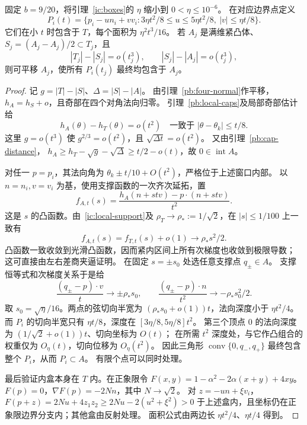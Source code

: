\begin{lemma}[小缺面积下侧弧内盒的传递]\label{ic:transfer}
固定 $b=9/20$，将引理~\ref{ic:boxes}的 $\eta$ 缩小到 $0<\eta\le10^{-6}$。
在对应边界点定义
\[
 P_i(t)=\{p_i-u n_i+v v_i:
 3\eta t^2/8\le u\le5\eta t^2/8,\ |v|\le\eta t/8\}.
\]
它们在小 $t$ 时包含于 $T$，每个面积为 $\eta^2t^3/16$。
若 $A_j$ 是满维紧凸体、$S_j=(A_j-A_j)/2\subset T_j$，且
\[
 |T_j|-|S_j|=o(t_j^3),\qquad |S_j|-|A_j|=o(t_j^3),
\]
则可平移 $A_j$，使所有 $P_i(t_j)$ 最终均包含于 $A_j$。
\end{lemma}
\begin{proof}
记 $g=|T|-|S|$、$\Delta=|S|-|A|$。
由引理~\ref{pb:four-normal}作平移，$h_A=h_S+o$，且奇部在四个对角法向归零。
引理~\ref{pb:local-caps}及局部奇部估计给
\begin{equation}\label{ic:local-support}
 h_A(\theta)-h_T(\theta)=o(t^2)
 \quad\text{一致于 }|\theta-\theta_k|\le t/8.
\end{equation}
这里 $g=o(t^3)$ 使 $g^{2/3}=o(t^2)$，且
$\sqrt{\Delta t}=o(t^2)$。
又由引理~\ref{pb:cap-distance}，
$h_A\ge h_T-\sqrt g-\sqrt\Delta\ge t/2-o(t)$，故 $0\in\operatorname{int}A$。

对任一 $p=p_i$，其法向角为
$\theta_k\pm t/10+O(t^2)$，严格位于上述窗口内部。
以 $n=n_i,v=v_i$ 为基，使用支撑函数的一次齐次延拓，置
\[
 f_{A,t}(s)=\frac{h_A(n+st v)-p\cdot(n+st v)}{t^2}.
\]
这是 $s$ 的凸函数。由~\eqref{ic:local-support}及
$\rho_T\to\rho_*:=1/\sqrt2$，在 $|s|\le1/100$ 上一致有
\[
 f_{A,t}(s)=f_{T,t}(s)+o(1)\longrightarrow\rho_*s^2/2.
\]
凸函数一致收敛到光滑凸函数，因而紧内区间上所有次梯度也收敛到极限导数；
这可直接由左右差商夹逼证明。
在固定 $s=\pm s_0$ 处选任意支撑点 $q_\pm\in A$。
支撑恒等式和次梯度关系于是给
\[
 \frac{(q_\pm-p)\cdot v}{t}\to\pm\rho_*s_0,
 \qquad
 \frac{(q_\pm-p)\cdot n}{t^2}\to-\rho_*s_0^2/2.
\]
取 $s_0=\sqrt\eta/16$。两点的弦切向半宽为
$(\rho_*s_0+o(1))t$，法向深度小于 $\eta t^2/4$。
而 $P_i$ 的切向半宽只有 $\eta t/8$，深度在
$[3\eta/8,5\eta/8]t^2$。
第三个顶点 $0$ 的法向深度为 $(1/\sqrt2+o(1))t$、切向坐标为 $O(t)$；
在所需 $t^2$ 深度处，与它作凸组合的权重仅为 $O_\eta(t)$，切向位移为 $O_\eta(t^2)$。
因此三角形 $\operatorname{conv}\{0,q_-,q_+\}$ 最终包含整个 $P_i$，从而 $P_i\subset A$。
有限个点可以同时处理。

最后验证内盒本身在 $T$ 内。在正象限令
$F(x,y)=1-\alpha^2-2\alpha(x+y)+4xy$。
$F(p)=0$，$\nabla F(p)=-2Nn$，其中 $N\to\sqrt2$。
对 $z=-un+\xi v_i$，
$F(p+z)=2Nu+4z_1z_2\ge2Nu-2(u^2+\xi^2)>0$
于上述盒内，且坐标仍在正象限边界分支内；其他盒由反射处理。
面积公式由两边长 $\eta t^2/4$、$\eta t/4$ 得到。
\end{proof}


